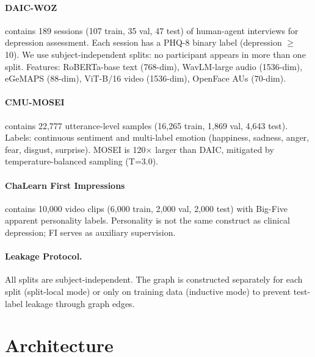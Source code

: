 \documentclass[twocolumn]{article}
\begin{document}
\paragraph{DAIC-WOZ} contains 189 sessions (107 train, 35 val, 47 test) of human-agent interviews for depression assessment. Each session has a PHQ-8 binary label (depression $\ge$ 10). We use subject-independent splits: no participant appears in more than one split. Features: RoBERTa-base text (768-dim), WavLM-large audio (1536-dim), eGeMAPS (88-dim), ViT-B/16 video (1536-dim), OpenFace AUs (70-dim).

\paragraph{CMU-MOSEI} \citep{zadeh2018multimodal} contains 22,777 utterance-level samples (16,265 train, 1,869 val, 4,643 test). Labels: continuous sentiment and multi-label emotion (happiness, sadness, anger, fear, disgust, surprise). MOSEI is 120$\times$ larger than DAIC, mitigated by temperature-balanced sampling (T=3.0).

\paragraph{ChaLearn First Impressions} \citep{escalante2020chalearn} contains 10,000 video clips (6,000 train, 2,000 val, 2,000 test) with Big-Five apparent personality labels. Personality is not the same construct as clinical depression; FI serves as auxiliary supervision.

\paragraph{Leakage Protocol.} All splits are subject-independent. The graph is constructed separately for each split (split-local mode) or only on training data (inductive mode) to prevent test-label leakage through graph edges.

\section{Architecture}
\label{sec:architecture}
\end{document}
